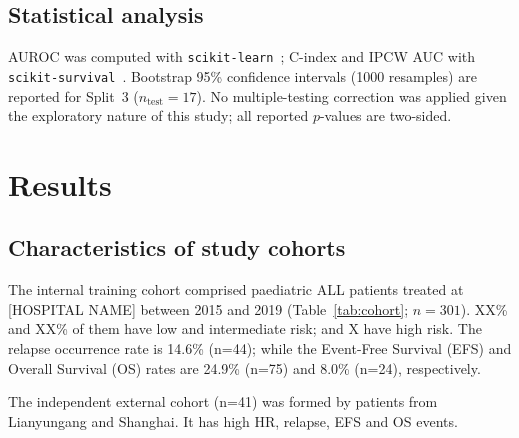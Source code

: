 \documentclass[pdflatex,sn-nature]{sn-jnl}
\begin{document}
\subsection{Statistical analysis}

AUROC was computed with \texttt{scikit-learn}~\cite{[CITE:sklearn]};
C-index and IPCW AUC with
\texttt{scikit-survival}~\cite{[CITE:sksurv]}.
Bootstrap 95\% confidence intervals (1000 resamples) are reported for
Split~3 ($n_\text{test}=17$).
No multiple-testing correction was applied given the exploratory nature
of this study; all reported $p$-values are two-sided.

\fi

\section{Results}\label{sec:results}

\subsection{Characteristics of study cohorts}
\label{sec:cohort}

The internal training cohort comprised paediatric ALL patients treated at [HOSPITAL NAME] between 2015 and 2019 (Table~\ref{tab:cohort}; $n=301$). XX\% and XX\% of them have low and intermediate risk; and X have high risk. The relapse occurrence rate is 14.6\% (n=44); while the Event-Free Survival (EFS) and Overall Survival (OS) rates are 24.9\% (n=75) and 8.0\% (n=24), respectively. 

The independent external cohort (n=41) was formed by patients from Lianyungang and Shanghai. It has high HR, relapse, EFS and OS events. 
\end{document}
